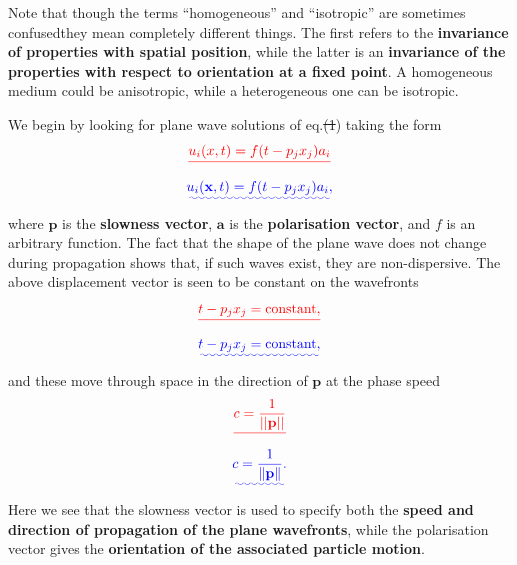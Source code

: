 \documentclass [a4paper,12pt]{paper}
\providecommand{\DIFadd}[1]{{\protect\color{blue}\uwave{#1}}} %
\providecommand{\DIFdel}[1]{{\protect\color{red}\sout{#1}}}                      %
\providecommand{\DIFaddbegin}{} %
\providecommand{\DIFaddend}{} %
\providecommand{\DIFdelbegin}{} %
\providecommand{\DIFdelend}{} %
\begin{document}
Note that though the terms ``homogeneous'' and ``isotropic'' are sometimes confused\DIFaddbegin \DIFadd{, }\DIFaddend they mean completely different things. The first refers to the 
\textbf{invariance of properties with spatial position}, while the latter is an \textbf{invariance of the
 properties with respect to orientation at a fixed point}. 
A homogeneous medium could be anisotropic, while a heterogeneous one can be isotropic.

We begin by looking for plane wave solutions of eq.\DIFdelbegin \DIFdel{(1}\DIFdelend \DIFaddbegin \DIFadd{~(\ref{eq:1}}\DIFaddend ) taking the form
\DIFdelbegin \begin{displaymath}
\DIFdel{u_{i}(x,t)=f(t-p_{j}x_{j})a_{i}
}\end{displaymath}%
\DIFdelend \DIFaddbegin \begin{equation}
\DIFadd{u_{i}(\mathbf{x},t)=f(t-p_{j}x_{j})a_{i},
\label{eq:2}
}\end{equation}\DIFaddend 
where $\mathbf{p}$ is the \textbf{slowness vector}, $\mathbf{a}$ is the \textbf{polarisation vector}, and $f$ is an arbitrary function. 
The fact that the shape of the plane wave does 
not change during propagation shows that, if such waves exist, they are non-dispersive. The above displacement vector is seen to be 
constant on the wavefronts
\DIFdelbegin \begin{displaymath}
\DIFdel{t-p_{j}x_{j}=\text{constant},
}\end{displaymath}%
\DIFdelend \DIFaddbegin \begin{equation}
\DIFadd{t-p_{j}x_{j}=\text{constant},
\label{eq:3}
}\end{equation}\DIFaddend 
and these move through space in the direction of $\mathbf{p}$ at the phase speed
\DIFdelbegin \begin{displaymath}
\DIFdel{c=\frac{1}{||\mathbf{p}||}
}\end{displaymath}%
\DIFdelend \DIFaddbegin \begin{equation}
\DIFadd{c=\frac{1}{\|\mathbf{p}\|}.
\label{eq:4}
}\end{equation}\DIFaddend 
Here we see that the slowness vector is used to specify both the \textbf{speed and direction of propagation of the plane wavefronts}, 
while the polarisation vector gives the \textbf{orientation of the associated particle motion}.
\end{document}
